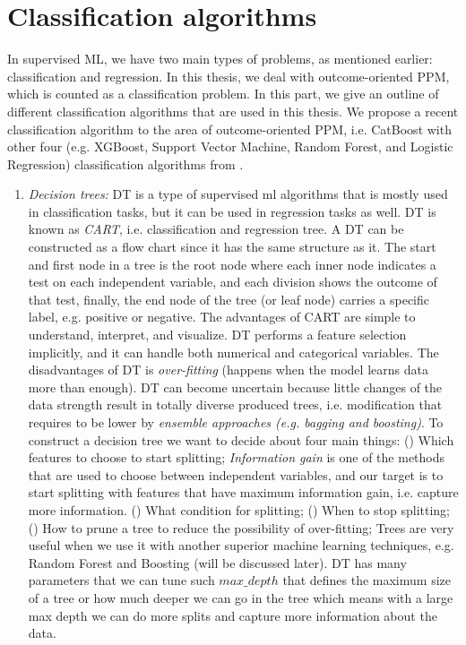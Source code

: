 \section{Classification algorithms}

In supervised ML, we have two main types of problems, as mentioned earlier: classification and regression. In this thesis, we deal with outcome-oriented PPM, which is counted as a classification problem. In this part, we give an outline of different classification algorithms that are used in this thesis. We propose a recent classification algorithm to the area of outcome-oriented PPM, i.e. CatBoost with other four (e.g. XGBoost, Support Vector Machine, Random Forest, and Logistic Regression) classification algorithms from \cite{teinemaa2019outcome}.

\begin{enumerate}
	\item \textit{Decision trees:} DT is a type of supervised ml algorithms that is mostly used in classification tasks, but it can be used in regression tasks as well. DT is known as \textit{CART}, i.e. classification and regression tree.  A DT can be constructed as a flow chart since it has the same structure as it. The start and first node in a tree is the root node where each inner node indicates a test on each independent variable, and each division shows the outcome of that test, finally, the end node of the tree (or leaf node) carries a specific label, e.g. positive or negative. The advantages of CART are simple to understand, interpret, and visualize. DT performs a feature selection implicitly, and it can handle both numerical and categorical variables. The disadvantages of DT is \textit{over-fitting} (happens when the model learns data more than enough). DT can become uncertain because little changes of the data strength result in totally diverse produced trees, i.e. modification that requires to be lower by \textit{ensemble approaches (e.g. bagging and boosting)}. To construct a decision tree we want to decide about four main things: () Which features to choose to start splitting; \textit{Information gain} is one of the methods that are used to choose between independent variables, and our target is to start splitting with features that have maximum information gain, i.e. capture more information. () What condition for splitting; () When to stop splitting; () How to prune a tree to reduce the possibility of over-fitting; Trees are very useful when we use it with another superior machine learning techniques, e.g. Random Forest and Boosting (will be discussed later). DT has many parameters that we can tune such $max\_depth$ that defines the maximum size of a tree or how much deeper we can go in the tree which means with a large max depth we can do more splits and capture more information about the data. 
	

\end{enumerate}
